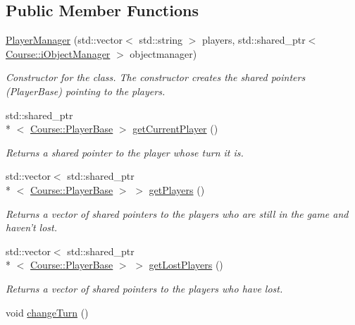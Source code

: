 \subsection*{Public Member Functions}
\begin{DoxyCompactItemize}
\item 
\hyperlink{class_student_1_1_player_manager_aa5cad17de967906a043004cdff97c919}{Player\-Manager} (std\-::vector$<$ std\-::string $>$ players, std\-::shared\-\_\-ptr$<$ \hyperlink{class_course_1_1i_object_manager}{Course\-::i\-Object\-Manager} $>$ objectmanager)
\begin{DoxyCompactList}\small\item\em Constructor for the class. The constructor creates the shared pointers (Player\-Base) pointing to the players. \end{DoxyCompactList}\item 
std\-::shared\-\_\-ptr\\*
$<$ \hyperlink{class_course_1_1_player_base}{Course\-::\-Player\-Base} $>$ \hyperlink{class_student_1_1_player_manager_a8e277ef3ea5f1f465c4c254786c1a665}{get\-Current\-Player} ()
\begin{DoxyCompactList}\small\item\em Returns a shared pointer to the player whose turn it is. \end{DoxyCompactList}\item 
std\-::vector$<$ std\-::shared\-\_\-ptr\\*
$<$ \hyperlink{class_course_1_1_player_base}{Course\-::\-Player\-Base} $>$ $>$ \hyperlink{class_student_1_1_player_manager_ac8719ba703e817006f757f82bc4e7cb8}{get\-Players} ()
\begin{DoxyCompactList}\small\item\em Returns a vector of shared pointers to the players who are still in the game and haven't lost. \end{DoxyCompactList}\item 
std\-::vector$<$ std\-::shared\-\_\-ptr\\*
$<$ \hyperlink{class_course_1_1_player_base}{Course\-::\-Player\-Base} $>$ $>$ \hyperlink{class_student_1_1_player_manager_a000eee3785e85c5aa139407fd72e38bd}{get\-Lost\-Players} ()
\begin{DoxyCompactList}\small\item\em Returns a vector of shared pointers to the players who have lost. \end{DoxyCompactList}\item 
void \hyperlink{class_student_1_1_player_manager_a3c994de59f1a1d96b9d4a742c8c7118a}{change\-Turn} ()

\end{DoxyCompactItemize}
